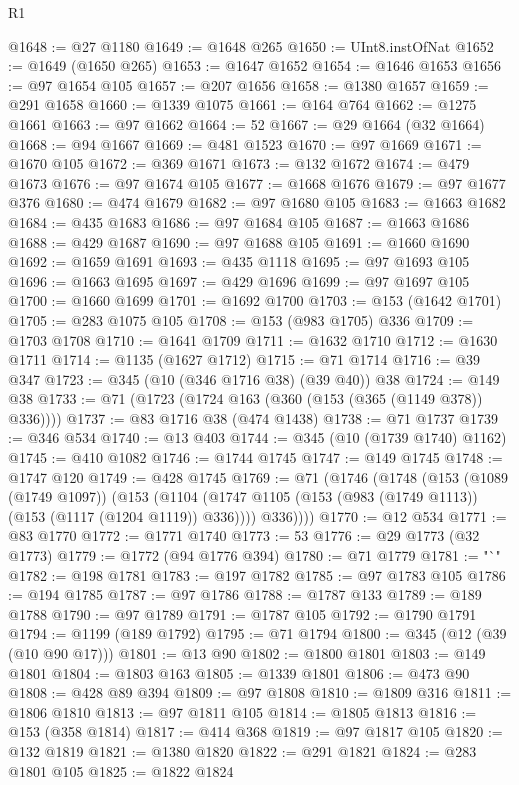 \begin{lexlean}{R1}
\begin{coremodule}
{{{{{{{{{{{{{{{{{{{{{{{{{{{{{{{{{{{{{{{{{{{{{{{{{{{{{{{{{{{{{{{{{{{{{{{{{{{{{{{{{{{{{{{{{{{{{{{{{{{{{{{{{{{{{{{{{{{{{{{{{{{{{{{{{{{{{{{{{{{{{{{{{{{{{{{{{{{{{{{{{{{{{{{{{{{{{{{{{{{{{{{{{{@1648 := @27 @1180
@1649 := @1648 @265
@1650 := UInt8.instOfNat
@1652 := @1649 (@1650 @265)
@1653 := @1647 @1652
@1654 := @1646 @1653
@1656 := @97 @1654 @105
@1657 := @207 @1656
@1658 := @1380 @1657
@1659 := @291 @1658
@1660 := @1339 @1075
@1661 := @164 @764
@1662 := @1275 @1661
@1663 := @97 @1662
@1664 := 52
@1667 := @29 @1664 (@32 @1664)
@1668 := @94 @1667
@1669 := @481 @1523
@1670 := @97 @1669
@1671 := @1670 @105
@1672 := @369 @1671
@1673 := @132 @1672
@1674 := @479 @1673
@1676 := @97 @1674 @105
@1677 := @1668 @1676
@1679 := @97 @1677 @376
@1680 := @474 @1679
@1682 := @97 @1680 @105
@1683 := @1663 @1682
@1684 := @435 @1683
@1686 := @97 @1684 @105
@1687 := @1663 @1686
@1688 := @429 @1687
@1690 := @97 @1688 @105
@1691 := @1660 @1690
@1692 := @1659 @1691
@1693 := @435 @1118
@1695 := @97 @1693 @105
@1696 := @1663 @1695
@1697 := @429 @1696
@1699 := @97 @1697 @105
@1700 := @1660 @1699
@1701 := @1692 @1700
@1703 := @153 (@1642 @1701)
@1705 := @283 @1075 @105
@1708 := @153 (@983 @1705) @336
@1709 := @1703 @1708
@1710 := @1641 @1709
@1711 := @1632 @1710
@1712 := @1630 @1711
@1714 := @1135 (@1627 @1712)
@1715 := @71 @1714
@1716 := @39 @347
@1723 := @345 (@10 (@346 @1716 @38) (@39 @40)) @38
@1724 := @149 @38
@1733 := @71 (@1723 (@1724 @163 (@360 (@153 (@365 (@1149 @378)) @336))))
@1737 := @83 @1716 @38 (@474 @1438)
@1738 := @71 @1737
@1739 := @346 @534
@1740 := @13 @403
@1744 := @345 (@10 (@1739 @1740) @1162)
@1745 := @410 @1082
@1746 := @1744 @1745
@1747 := @149 @1745
@1748 := @1747 @120
@1749 := @428 @1745
@1769 := @71
    (@1746
      (@1748
        (@153
          (@1089 (@1749 @1097))
          (@153
            (@1104 (@1747 @1105 (@153 (@983 (@1749 @1113)) (@153 (@1117 (@1204 @1119)) @336))))
            @336))))
@1770 := @12 @534
@1771 := @83 @1770
@1772 := @1771 @1740
@1773 := 53
@1776 := @29 @1773 (@32 @1773)
@1779 := @1772 (@94 @1776 @394)
@1780 := @71 @1779
@1781 := "`"
@1782 := @198 @1781
@1783 := @197 @1782
@1785 := @97 @1783 @105
@1786 := @194 @1785
@1787 := @97 @1786
@1788 := @1787 @133
@1789 := @189 @1788
@1790 := @97 @1789
@1791 := @1787 @105
@1792 := @1790 @1791
@1794 := @1199 (@189 @1792)
@1795 := @71 @1794
@1800 := @345 (@12 (@39 (@10 @90 @17)))
@1801 := @13 @90
@1802 := @1800 @1801
@1803 := @149 @1801
@1804 := @1803 @163
@1805 := @1339 @1801
@1806 := @473 @90
@1808 := @428 @89 @394
@1809 := @97 @1808
@1810 := @1809 @316
@1811 := @1806 @1810
@1813 := @97 @1811 @105
@1814 := @1805 @1813
@1816 := @153 (@358 @1814)
@1817 := @414 @368
@1819 := @97 @1817 @105
@1820 := @132 @1819
@1821 := @1380 @1820
@1822 := @291 @1821
@1824 := @283 @1801 @105
@1825 := @1822 @1824
}}}}}}}}}}}}}}}}}}}}}}}}}}}}}}}}}}}}}}}}}}}}}}}}}}}}}}}}}}}}}}}}}}}}}}}}}}}}}}}}}}}}}}}}}}}}}}}}}}}}}}}}}}}}}}}}}}}}}}}}}}}}}}}}}}}}}}}}}}}}}}}}}}}}}}}}}}}}}}}}}}}}}}}}}}}}}}}}}}}}}}}}}}
\end{coremodule}
\end{lexlean}
